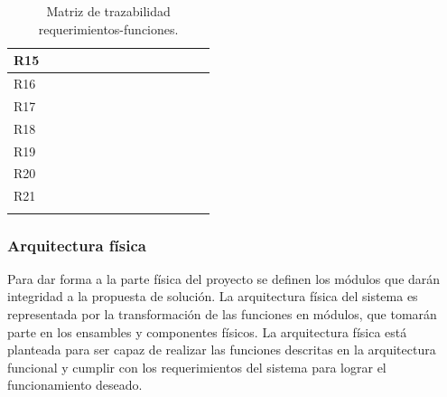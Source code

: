 \begin{center}
\begin{longtable}[!htb]{| m{2em} || m{2em} | m{2em}| m{2em}| m{2em}| m{2em}| m{2em}| m{2em}| m{2em}| m{2em}| m{2em}| m{2em}| m{2em}| m{2em}|}
    \hline
    R15 & & & &\cellcolor{gr}{} &\cellcolor{gr}{} &\cellcolor{gr}{} & & & & & & &\\
    \hline
    R16 & & & & & & & & & & & \cellcolor{gr}{}& \cellcolor{gr}{}&\cellcolor{gr}{}\\
    \hline
    R17 & & & & & & & & & & & \cellcolor{gr}{}& \cellcolor{gr}{}&\cellcolor{gr}{}\\
    \hline
    R18 & & & & & & &\cellcolor{gr}{} & & &\cellcolor{gr}{} & & &\\
    \hline
    R19 & & & &\cellcolor{gr}{} &\cellcolor{gr}{} &\cellcolor{gr}{} & & & & & & &\\
    \hline
    R20 & & & &\cellcolor{gr}{} &\cellcolor{gr}{} &\cellcolor{gr}{} & & & & & & &\\
    \hline
    R21 & & & & & & & &\cellcolor{gr}{} &\cellcolor{gr}{} & & & &\\
    \hline

    \caption{\footnotesize Matriz de trazabilidad requerimientos-funciones.}
    \label{tab:MatTraza_ReqFun}
    \end{longtable}
\end{center}

\subsubsection{Arquitectura física}
Para dar forma a la parte física del proyecto se definen los módulos que darán integridad a la propuesta de solución. La arquitectura física del sistema es representada por la transformación de las funciones en módulos, que tomarán parte en los ensambles y componentes físicos. La arquitectura física está planteada para ser capaz de realizar las funciones descritas en la arquitectura funcional y cumplir con los requerimientos del sistema para lograr el funcionamiento deseado.


